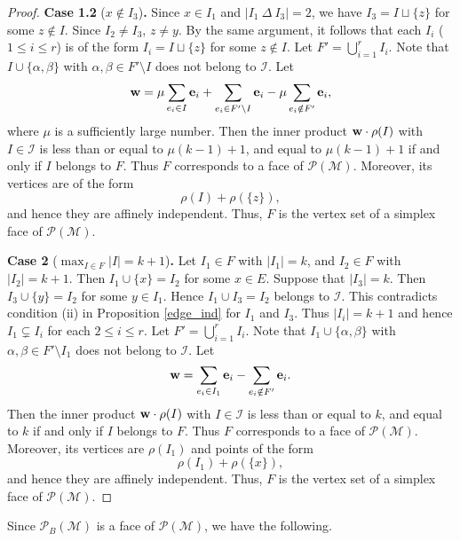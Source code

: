\documentclass[12pt]{amsart}
\theoremstyle{definition}
\numberwithin{thm}{section}
\numberwithin{equation}{section}
\def\eb{{\mathbf e}}
\begin{document}
\begin{proof}
\noindent
{\bf Case 1.2} ($x \notin I_3$){\bf .}
Since $x \in I_1$ and  $|I_1 \ \Delta\  I_3| =2$, we have $I_3 = I \sqcup \{z\}$
for some $z \notin I$.
Since $I_2 \ne I_3$, $z \ne y$.
By the same argument, it follows that each $I_i$ ($1 \le i \le r$) is of the form
$I_i =I \sqcup \{z\}$ for some $z \notin I$.
Let $F' = \bigcup_{i=1}^r I_i$.
Note that $I \cup \{\alpha, \beta\}$ with $\alpha , \beta \in F' \setminus I$ does not belong to ${\mathcal I}$.
Let 
$${\bf w} = \mu \sum_{e_i \in  I} \eb_i +
\sum_{e_i \in  F' \setminus I} \eb_i - \mu \sum_{e_i \notin F'} \eb_i,$$
where $\mu$ is a sufficiently large number.
Then the inner product ${\bf w} \cdot \rho(I)$ with $I \in {\mathcal I}$
is less than or equal to $\mu (k-1) +1$, 
and equal to $\mu (k-1) +1$ if and only if $I$ belongs to $F$.
Thus $F$ corresponds to a face of ${\mathcal P}({\mathcal M})$.
Moreover, its vertices are of the form \[ \rho(I)+\rho(\{z\}), \] and hence they are affinely independent. Thus, \(F\) is the vertex set of a simplex face of \({\mathcal P}({\mathcal M})\).


\bigskip

\noindent
{\bf Case 2} ($\max_{I \in F} |I|=k+1$){\bf .}
Let $I_1 \in F$ with $|I_1| =k$, and $I_2 \in F$ with $|I_2| =k+1$.
Then $I_1 \cup \{x\} = I_2$ for some $x \in E$.
Suppose that $|I_3|=k$.
Then $I_3 \cup \{y\} = I_2$ for some $y \in I_1$.
Hence $I_1 \cup I_3 = I_2$ belongs to ${\mathcal I}$.
This contradicts condition (ii) in Proposition \ref{edge_ind}
for $I_1$ and $I_3$.
Thus $|I_i|=k+1$ and hence $I_1 \subsetneq I_i$ for each $2 \le i \le r$.
Let $F' = \bigcup_{i=1}^r I_i$.
Note that $I_1 \cup \{\alpha, \beta\}$ with $\alpha , \beta \in F' \setminus I_1$ does not belong to ${\mathcal I}$.
Let 
$${\bf w} =  \sum_{e_i \in  I_1} \eb_i  - \sum_{e_i \notin F'} \eb_i.$$
Then the inner product ${\bf w} \cdot \rho(I)$ with $I \in {\mathcal I}$
is less than or equal to $k$, 
and equal to $k$ if and only if $I$ belongs to $F$.
Thus $F$ corresponds to a face of ${\mathcal P}({\mathcal M})$.
Moreover, its vertices are \(\rho(I_1)\) and points of the form \[ \rho(I_1)+\rho(\{x\}), \] and hence they are affinely independent. Thus, \(F\) is the vertex set of a simplex face of \({\mathcal P}({\mathcal M})\).
\end{proof}

Since ${\mathcal P}_{B} ({\mathcal M})$ is a face of ${\mathcal P}({\mathcal M})$, we have the following.
\end{document}
